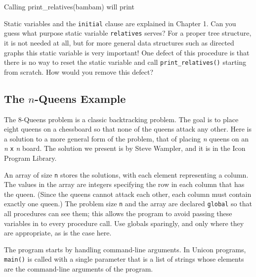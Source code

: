 Calling print\_relatives(bambam) will print


Static variables and the \texttt{initial} clause are explained in
Chapter 1. Can you guess what purpose static variable
\texttt{relatives} serves? For a proper tree structure, it is not
needed at all, but for more general data structures such as directed
graphs this static variable is very important! One defect of this
procedure is that there is no way to reset the static variable and call
\texttt{print\_relatives()} starting from scratch. How would you remove
this defect?

\subsection*{The $n$-Queens Example}

The 8-Queens problem is a classic
backtracking problem. The goal is to place eight
queens on a chessboard so that none of the queens attack any other.
Here is a solution to a more general form of the problem, that of
placing \textit{n} queens on an \textit{n} \texttt{x}
\textit{n} board. The solution we present is by Steve Wampler, and it is in the Icon Program Library.

An array of size \texttt{n} stores the solutions, with each element
representing a column. The values in the array are integers specifying
the row in each column that has the queen. (Since the queens cannot
attack each other, each column must contain exactly one queen.) The
problem size \texttt{n} and the array are declared \texttt{global} so
that all procedures can see them; this allows the program to avoid
passing these variables in to every procedure call. Use globals
sparingly, and only where they are appropriate, as is the case here.


The program starts by handling command-line arguments. In Unicon
programs, \texttt{main()} is called with a single parameter that is a
list of strings whose elements are the command-line arguments of the
program.

